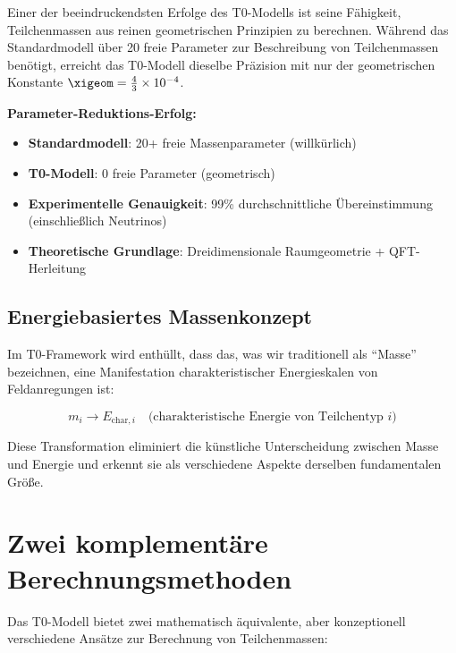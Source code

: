 	Einer der beeindruckendsten Erfolge des T0-Modells ist seine Fähigkeit, Teilchenmassen aus reinen geometrischen Prinzipien zu berechnen. Während das Standardmodell über 20 freie Parameter zur Beschreibung von Teilchenmassen benötigt, erreicht das T0-Modell dieselbe Präzision mit nur der geometrischen Konstante $\xigeom = \frac{4}{3} \times 10^{-4}$.
	
	\begin{tcolorbox}[colback=green!5!white,colframe=green!75!black,title=Massen-Revolution]
		\textbf{Parameter-Reduktions-Erfolg:}
		\begin{itemize}
			\item \textbf{Standardmodell}: 20+ freie Massenparameter (willkürlich)
			\item \textbf{T0-Modell}: 0 freie Parameter (geometrisch)
			\item \textbf{Experimentelle Genauigkeit}: 99\% durchschnittliche Übereinstimmung (einschließlich Neutrinos)
			\item \textbf{Theoretische Grundlage}: Dreidimensionale Raumgeometrie + QFT-Herleitung
		\end{itemize}
	\end{tcolorbox}
	
	\subsection{Energiebasiertes Massenkonzept}
	\label{subsec:energy_based_mass}
	
	Im T0-Framework wird enthüllt, dass das, was wir traditionell als ``Masse'' bezeichnen, eine Manifestation charakteristischer Energieskalen von Feldanregungen ist:
	
	\begin{equation}
		\boxed{m_i \rightarrow E_{\text{char},i} \quad \text{(charakteristische Energie von Teilchentyp } i\text{)}}
		\label{eq:mass_to_energy}
	\end{equation}
	
	Diese Transformation eliminiert die künstliche Unterscheidung zwischen Masse und Energie und erkennt sie als verschiedene Aspekte derselben fundamentalen Größe.
	
	\section{Zwei komplementäre Berechnungsmethoden}
	\label{sec:two_calculation_methods}
	
	Das T0-Modell bietet zwei mathematisch äquivalente, aber konzeptionell verschiedene Ansätze zur Berechnung von Teilchenmassen:
	

